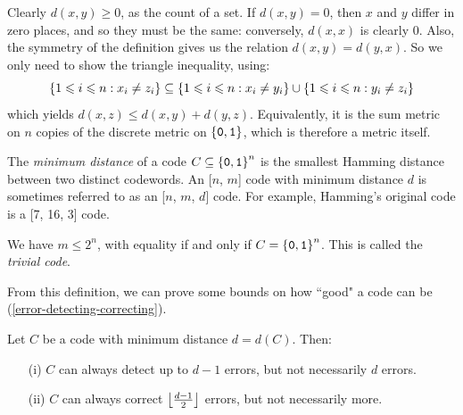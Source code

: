 \documentclass{article}
\begin{document}
\begin{prf}
    Clearly $d(x, y) \geq 0$, as the count of a set.
    If $d(x, y) = 0$, then $x$ and $y$ differ in zero places,
    and so they must be the same: conversely, $d(x, x)$ is clearly 0.
    Also, the symmetry of the definition gives us the relation $d(x, y) = d(y, x)$.
    So we only need to show the triangle inequality, using:
    \[
	\left\lbrace 1 \leqslant i \leqslant n : x_i \neq z_i \right\rbrace
	\subseteq
	\left\lbrace 1 \leqslant i \leqslant n : x_i \neq y_i \right\rbrace
	\cup
	\left\lbrace 1 \leqslant i \leqslant n : y_i \neq z_i \right\rbrace
	\]
	which yields $d(x, z) \leq d(x, y) + d(y, z)$. Equivalently, it is
	the sum metric on $n$ copies of the discrete metric on $\left\lbrace \texttt{0}, \texttt{1} \right\rbrace$,
	which is therefore a metric itself.
\end{prf}

\begin{definition}
    The \textit{minimum distance} of a code $C \subseteq \left\lbrace \texttt{0}, \texttt{1} \right\rbrace^n$
    is the smallest Hamming distance between two distinct codewords.
    An [$n$, $m$] code with minimum distance $d$
    is sometimes referred to as an [$n$, $m$, $d$] code.
    For example, Hamming's original code is a [7, 16, 3] code.
\end{definition}

\begin{note}
	We have $m \leq 2^n$, with equality if and only if $C = \left\lbrace \texttt{0}, \texttt{1} \right\rbrace^n$.
	This is called the \textit{trivial code}.
\end{note}

From this definition,
we can prove some bounds on how ``good" a code can be
(\ref{error-detecting-correcting}).

\begin{proposition}
    Let $C$ be a code with minimum distance $d = d(C)$. Then:
    
    \begin{enumerate}
    	\item[(i)] $C$ can always detect up to $d-1$ errors, but not necessarily $d$ errors.
    	\item[(ii)] $C$ can always correct $\left\lfloor\frac{d-1}{2}\right\rfloor$ errors, but not necessarily more.
	\end{enumerate}
\end{proposition}
\end{document}
